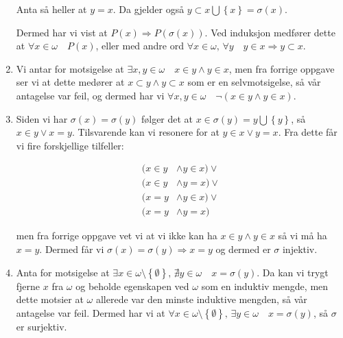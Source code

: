 \documentclass{article}[norsk]
\begin{document}
\begin{enumerate}[label=(\roman*)]
    Anta så heller at $y = x$. Da gjelder også $y\subset x\bigcup\left\{x\right\}=\sigma(x)$. 
    
    Dermed har vi vist at $P(x)\Rightarrow P(\sigma(x))$. Ved induksjon medfører dette at $\forall x\in\omega\quad P(x)$, eller med andre ord $\forall x\in\omega,\,\forall y\quad y\in x \Rightarrow y\subset x$. 
    
    \item Vi antar for motsigelse at $\exists x,y\in \omega\quad x\in y \wedge y\in x$, men fra forrige oppgave ser vi at dette medører at $x\subset y \wedge y\subset x$ som er en selvmotsigelse, så vår antagelse var feil, og dermed har vi $\forall x,y\in \omega \quad \neg\left(x\in y \wedge y \in x\right)$.
    
    \item Siden vi har $\sigma(x)=\sigma(y)$ følger det at $x\in \sigma(y)=y\bigcup \left\{y\right\}$, så $x\in y\vee x = y$. Tilsvarende kan vi resonere for at $y\in x \vee y=x$. Fra dette får vi fire forskjellige tilfeller:
    
    \begin{equation*} \begin{aligned}
    (x\in y&\wedge y\in x) \vee\\
    (x\in y&\wedge y = x) \vee\\
    (x = y &\wedge y\in x)\vee\\
    (x=y &\wedge y=x)
    \end{aligned} \end{equation*}
    
    men fra forrige oppgave vet vi at vi ikke kan ha $x\in y \wedge y\in x$ så vi må ha $x=y$. Dermed får vi $\sigma(x)=\sigma(y)\Rightarrow x=y$ og dermed er $\sigma$ injektiv.
    
    \item Anta for motsigelse at $\exists x\in\omega\setminus\left\{\emptyset\right\},\,\nexists y\in\omega \quad x= \sigma(y)$. Da kan vi trygt fjerne $x$ fra $\omega$ og beholde egenskapen ved $\omega$ som en induktiv mengde, men dette motsier at $\omega$ allerede var den minste induktive mengden, så vår antagelse var feil. Dermed har vi at $\forall x\in\omega\setminus\left\{\emptyset\right\},\,\exists y\in\omega\quad x=\sigma(y)$, så $\sigma$ er surjektiv. 
\end{enumerate}
\end{document}
